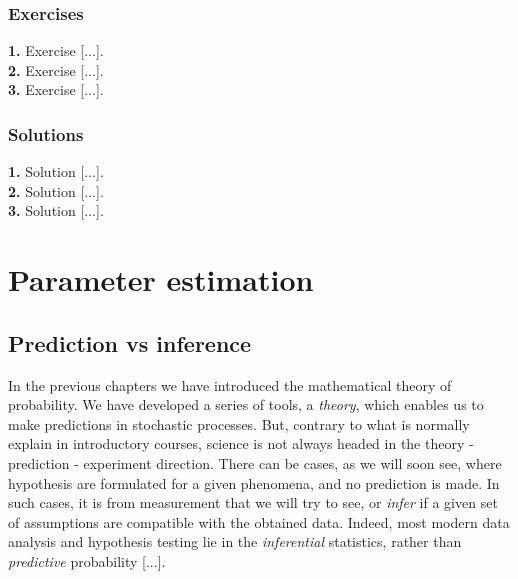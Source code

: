 \documentclass{book}
\begin{document}
\newpage

\subsection*{Exercises}

\textbf{1.} Exercise [...].\\

\textbf{2.} Exercise [...].\\

\textbf{3.} Exercise [...].\\

\newpage

\subsection*{Solutions}

\textbf{1.} Solution [...].\\

\textbf{2.} Solution [...].\\

\textbf{3.} Solution [...].\\



\chapter{Parameter estimation}

\section{Prediction vs inference}

In the previous chapters we have introduced the mathematical theory of probability. We have developed a series of tools, a \textit{theory}, which enables us to make predictions in stochastic processes. But, contrary to what is normally explain in introductory courses, science is not always headed in the theory - prediction - experiment direction. There can be cases, as we will soon see, where hypothesis are formulated for a given phenomena, and no prediction is made. In such cases, it is from measurement that we will try to see, or \textit{infer} if a given set of assumptions are compatible with the obtained data. Indeed, most modern data analysis and hypothesis testing lie in the \textit{inferential} statistics, rather than \textit{predictive} probability [...].\\
\end{document}
